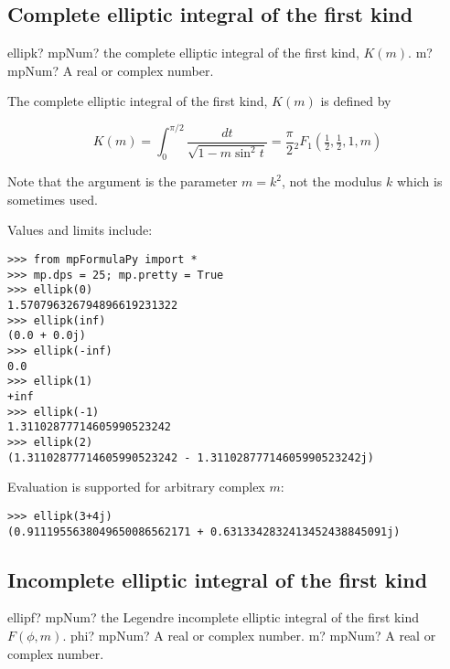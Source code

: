 \subsection{Complete elliptic integral of the first kind}

\begin{mpFunctionsExtract}
	\mpFunctionOne
	{ellipk? mpNum? the complete elliptic integral of the first kind, $K(m)$.}
	{m? mpNum? A real or complex number.}
\end{mpFunctionsExtract}


\vpara
The complete elliptic integral of the first kind, $K(m)$ is defined by

\begin{equation}
K(m)=\int_0^{\pi/2} \frac{dt}{\sqrt{1-m \sin^2 t}} = \frac{\pi}{2} {}_2F_1 \left(\tfrac{1}{2},\tfrac{1}{2},1,m \right)
\end{equation}

Note that the argument is the parameter $m=k^2$, not the modulus $k$ which is sometimes used.

Values and limits include:

\begin{lstlisting}
>>> from mpFormulaPy import *
>>> mp.dps = 25; mp.pretty = True
>>> ellipk(0)
1.570796326794896619231322
>>> ellipk(inf)
(0.0 + 0.0j)
>>> ellipk(-inf)
0.0
>>> ellipk(1)
+inf
>>> ellipk(-1)
1.31102877714605990523242
>>> ellipk(2)
(1.31102877714605990523242 - 1.31102877714605990523242j)
\end{lstlisting}

Evaluation is supported for arbitrary complex $m$:

\begin{lstlisting}
>>> ellipk(3+4j)
(0.9111955638049650086562171 + 0.6313342832413452438845091j)
\end{lstlisting}




\subsection{Incomplete elliptic integral of the first kind}

\begin{mpFunctionsExtract}
	\mpFunctionTwo
	{ellipf? mpNum? the Legendre incomplete elliptic integral of the first kind $F(\phi,m)$.}
	{phi? mpNum? A real or complex number.}
	{m? mpNum? A real or complex number.}	
\end{mpFunctionsExtract}


